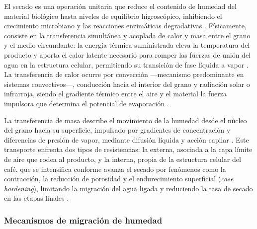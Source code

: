 El secado es una operación unitaria que reduce el contenido de humedad del material 
biológico hasta niveles de equilibrio higroscópico, inhibiendo el crecimiento 
microbiano y las reacciones enzimáticas degradativas 
\parencite{abbaspour-gilandeh_effect_2021, abidin_improving_2024, 
coelho_physicochemical_2024, cruz-ospina_improving_2026}. Físicamente, consiste en 
la transferencia simultánea y acoplada de calor y masa entre el grano y el medio 
circundante: la energía térmica suministrada eleva la temperatura del producto y 
aporta el calor latente necesario para romper las fuerzas de unión del agua en la 
estructura celular, permitiendo su transición de fase líquida a vapor 
\parencite{fauzi_experimental_2025, geng_thermodynamically_2023, yu_current_2025, 
abidin_improving_2024, li_study_2021}. La transferencia de calor ocurre por 
convección —mecanismo predominante en sistemas convectivos—, conducción hacia el 
interior del grano y radiación solar o infrarroja, siendo el gradiente térmico entre 
el aire y el material la fuerza impulsora que determina el potencial de evaporación 
\parencite{chojnacka_improvements_2021, yu_current_2025, nafisah_implementation_2024, 
liu_optimization_2025, abdissa_harmonizing_2023, cruz-ospina_improving_2026, 
institute_of_food_and_biotechnology_can_tho_university_vietnam_impact_2022, 
p_romero_leiton_mathematical_2025}.

La transferencia de masa describe el movimiento de la humedad desde el núcleo del 
grano hacia su superficie, impulsado por gradientes de concentración y diferencias 
de presión de vapor, mediante difusión líquida y acción capilar 
\parencite{yu_current_2025, cruz-ospina_improving_2026, hadibi_effect_2025, 
fauzi_experimental_2025}. Este transporte enfrenta dos tipos de resistencias: la 
externa, asociada a la capa límite de aire que rodea al producto, y la interna, 
propia de la estructura celular del café, que se intensifica conforme avanza el 
secado por fenómenos como la contracción, la reducción de porosidad y el 
endurecimiento superficial (\textit{case hardening}), limitando la migración del 
agua ligada y reduciendo la tasa de secado en las etapas finales 
\parencite{bustos-vanegas_numerical_2022, tejeda-miramontes_phase-segmented_2025, 
geng_thermodynamically_2023, liu_optimization_2025, abbaspour-gilandeh_effect_2021, 
abreu_influence_2025}.

\subsubsection{Mecanismos de migración de humedad}


